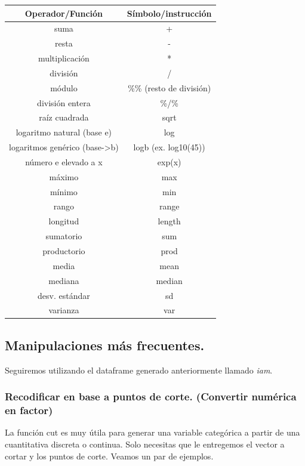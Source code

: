 \documentclass[
  letterpaper,
  DIV=11,
  numbers=noendperiod]{scrreprt}
\begin{document}
\begin{longtable}[]{@{}cc@{}}
\toprule()
\textbf{Operador/Función} & \textbf{Símbolo/instrucción} \\
\midrule()
\endhead
suma & + \\
resta & - \\
multiplicación & * \\
división & / \\
módulo & \%\% (resto de división) \\
división entera & \%/\% \\
raíz cuadrada & sqrt \\
logaritmo natural (base e) & log \\
logaritmos genérico (base-\textgreater b) & logb (ex. log10(45)) \\
número e elevado a x & exp(x) \\
máximo & max \\
mínimo & min \\
rango & range \\
longitud & length \\
sumatorio & sum \\
productorio & prod \\
media & mean \\
mediana & median \\
desv. estándar & sd \\
varianza & var \\
\bottomrule()
\end{longtable}

\hypertarget{manipulaciones-muxe1s-frecuentes.}{%
\subsection{Manipulaciones más
frecuentes.}\label{manipulaciones-muxe1s-frecuentes.}}

Seguiremos utilizando el dataframe generado anteriormente llamado
\emph{iam}.

\hypertarget{recodificar-en-base-a-puntos-de-corte.-convertir-numuxe9rica-en-factor}{%
\subsubsection{Recodificar en base a puntos de corte. (Convertir
numérica en
factor)}\label{recodificar-en-base-a-puntos-de-corte.-convertir-numuxe9rica-en-factor}}

La función cut es muy útila para generar una variable categórica a
partir de una cuantitativa discreta o continua. Solo necesitas que le
entregemos el vector a cortar y los puntos de corte. Veamos un par de
ejemplos.
\end{document}
